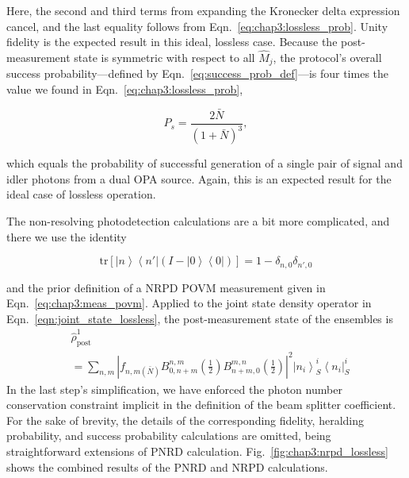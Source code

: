\documentclass[aps,twocolumn,secnumarabic,amsmath,amssymb,pra,groupedaddress,
showpacs, showkeys,draft]{revtex4-1}
\newcommand{\bra}[1]{\left\langle #1 \right|}
\newcommand{\ket}[1]{\left|#1\right\rangle}
\newcommand{\pna}[1]{\left(#1\right)}
\newcommand{\pnb}[1]{\left[#1\right]}
\newcommand{\eqn}[1]{
\begin{equation}
	#1
\end{equation}
}
\newcommand{\abs}[1]{\left|#1\right|}
\begin{document}
Here, the second and third terms from expanding the Kronecker delta expression
cancel, and the last equality follows from
Eqn.~\ref{eq:chap3:lossless_prob}. Unity fidelity is the expected result in
this ideal, lossless case. Because the post-measurement state is symmetric with
respect to all $\hat{M}_j$, the protocol's overall success
probability---defined by Eqn.~\ref{eq:success_prob_def}---is four times the
value we found in Eqn.~\ref{eq:chap3:lossless_prob},
\eqn{
P_{s}= \frac{2\bar{N}}{\pna{1+\bar{N}}^3},
}
which equals the probability of successful generation of a single pair of
signal and idler photons from a dual OPA source. Again, this is an expected
result for the ideal case of lossless operation. 

The non-resolving photodetection calculations are a bit more complicated, and
there we use the identity
\eqn{
\textrm{tr}\pnb{\ket{n}\bra{n'}\pna{I-\ket{0}\bra{0}}}=1-\delta_{n,0}\delta_{n',0}
}
and the prior definition of a NRPD POVM measurement given in
Eqn.~\ref{eq:chap3:meas_povm}. Applied to the joint state density operator in
Eqn.~\ref{eqn:joint_state_lossless}, the post-measurement state of the
ensembles is
\begin{align}
&\hat{\rho}_{\textrm{post}}^{1} \nonumber \\
& = \sum_{n,m} \abs{f_{n,m\pna{\bar{N}}} B_{0,n+m}^{n,m}\pna{\frac{1}{2}} B_{n+m,0}^{m,n}\pna{\frac{1}{2} }}^2 \ket{n_i}^i_S\bra{n_i}^i_S
\end{align}
In the last step's simplification, we have enforced the photon number
conservation constraint implicit in the definition of the beam splitter
coefficient. For the sake of brevity, the details of the corresponding
fidelity, heralding probability, and success probability calculations are
omitted, being straightforward extensions of PNRD
calculation. Fig.~\ref{fig:chap3:nrpd_lossless} shows the combined results of
the PNRD and NRPD calculations.
\end{document}
